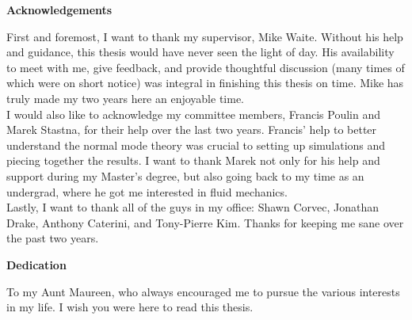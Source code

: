 \cleardoublepage


\begin{center}\textbf{Acknowledgements}\end{center}

First and foremost, I want to thank my supervisor, Mike Waite. Without his help and guidance, this thesis would have never seen the light of day. His availability to meet with me, give feedback, and provide thoughtful discussion (many times of which were on short notice) was integral in finishing this thesis on time. Mike has truly made my two years here an enjoyable time.\\

I would also like to acknowledge my committee members, Francis Poulin and Marek Stastna, for their help over the last two years. Francis' help to better understand the normal mode theory was crucial to setting up simulations and piecing together the results. I want to thank Marek not only for his help and support during my Master's degree, but also going back to my time as an undergrad, where he got me interested in fluid mechanics. \\

Lastly, I want to thank all of the guys in my office: Shawn Corvec, Jonathan Drake, Anthony Caterini, and Tony-Pierre Kim. Thanks for keeping me sane over the past two years.  
\cleardoublepage


\begin{center}\textbf{Dedication}\end{center}

\noindent To my Aunt Maureen, who always encouraged me to pursue the various interests in my life. I wish you were here to read this thesis.

\cleardoublepage

\renewcommand\contentsname{Table of Contents}
\tableofcontents
\cleardoublepage
{}

\listoftables
\cleardoublepage
{}		%

\listoffigures
\cleardoublepage
{}		%


\newpage
